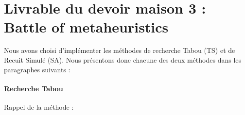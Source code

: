 
\section*{Livrable du devoir maison 3 : \\ Battle of metaheuristics}

%
%

\vspace{5mm}
\noindent
{}
\vspace{2mm}



Nous avons choisi d'implémenter les méthodes de recherche Tabou (TS) et de Recuit Simulé (SA). 
Nous présentons donc chacune des deux méthodes dans les paragraphes suivants :

\paragraph{Recherche Tabou}

Rappel de la méthode :

